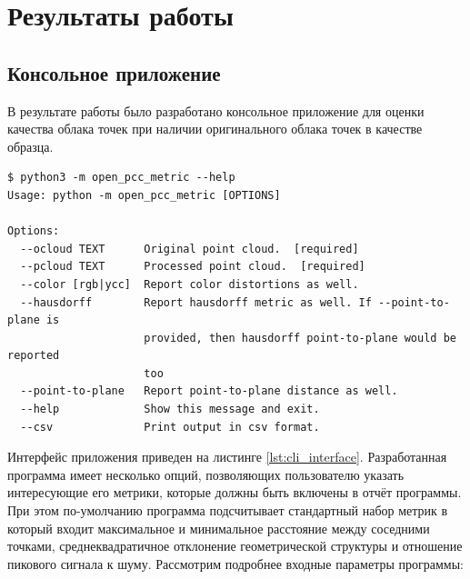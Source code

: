 

\newpage
\chapter{Результаты работы}

\section{Консольное приложение}

В результате работы было разработано консольное приложение для оценки качества
облака точек при наличии оригинального облака точек в качестве образца.

\begin{lstlisting}[caption={
    Интерфейс разработанного консольного приложения
}, basicstyle=\footnotesize\ttfamily, label={lst:cli_interface}]
$ python3 -m open_pcc_metric --help
Usage: python -m open_pcc_metric [OPTIONS]

Options:
  --ocloud TEXT      Original point cloud.  [required]
  --pcloud TEXT      Processed point cloud.  [required]
  --color [rgb|ycc]  Report color distortions as well.
  --hausdorff        Report hausdorff metric as well. If --point-to-plane is
                     provided, then hausdorff point-to-plane would be reported
                     too
  --point-to-plane   Report point-to-plane distance as well.
  --help             Show this message and exit.
  --csv              Print output in csv format.
\end{lstlisting}

Интерфейс приложения приведен на листинге \ref{lst:cli_interface}. Разработанная
программа имеет несколько опций, позволяющих пользователю указать интересующие
его метрики, которые должны быть включены в отчёт программы. При этом
по-умолчанию программа подсчитывает стандартный набор метрик в который входит
максимальное и минимальное расстояние между соседними точками,
среднеквадратичное отклонение геометрической структуры и отношение пикового
сигнала к шуму. Рассмотрим подробнее входные параметры программы:


